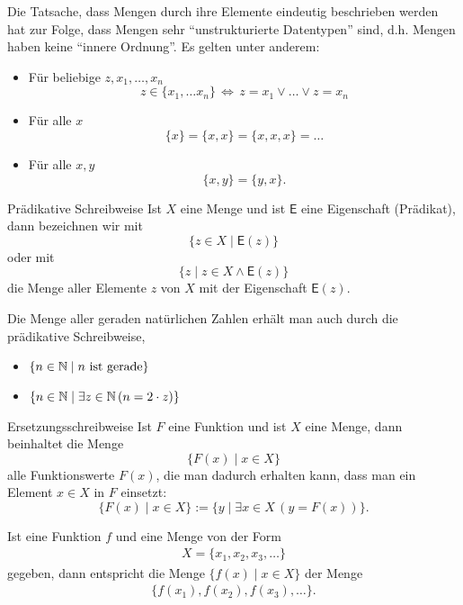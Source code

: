 \begin{remark}
    Die Tatsache, dass Mengen durch ihre Elemente eindeutig beschrieben werden hat zur Folge, dass Mengen sehr ``unstrukturierte Datentypen'' sind, d.h. Mengen haben keine ``innere Ordnung''. Es gelten unter anderem:
    \begin{itemize}
        \item Für beliebige $z,x_1,\dots,x_n$
            \[
                z\in\{x_1,\dots x_n\}\,\Leftrightarrow\, z=x_1\lor\dots\lor z=x_n
            \]
        \item Für alle $x$
            \[
                \{x\}=\{x,x\}=\{x,x,x\}=\dots
            \]
        \item Für alle $x,y$
            \[
                \{x,y\}=\{y,x\}.
            \]
    \end{itemize}
\end{remark}

\begin{concept}{Prädikative Schreibweise}
    Ist $X$ eine Menge und ist $\mathsf{E}$ eine Eigenschaft (Prädikat), dann bezeichnen wir mit
    \[
        \big\{z\in X\mid \mathsf{E}(z)\big\}
    \]
    oder mit
    \[
        \big\{z\mid z\in X\land\mathsf{E}(z)\big\}
    \]
    die Menge aller Elemente $z$ von $X$ mit der Eigenschaft $\mathsf{E}(z)$.
\end{concept}

\begin{example}
    Die Menge aller geraden natürlichen Zahlen erhält man auch durch die prädikative Schreibweise,
    \begin{itemize}
        \item $\{n\in\mathbb{N}\mid n\text{ ist gerade}\}$
        \item $\{n\in\mathbb{N}\mid \exists z\in\mathbb{N}\,(n=2\cdot z)\}$
    \end{itemize}
\end{example}

\begin{concept}{Ersetzungsschreibweise}
    Ist $F$ eine Funktion und ist $X$ eine Menge, dann beinhaltet die Menge
    \[
        \big\{F(x)\mid x\in X \big\}
    \]
    alle Funktionswerte $F(x)$, die man dadurch erhalten kann, dass man ein Element $x\in X$ in $F$ einsetzt:
    \[
        \big\{F(x)\mid x\in X\big\}:=\{y\mid \exists x\in X\,(y=F(x))\}.
    \]
\end{concept}

\begin{remark}
    Ist eine Funktion $f$ und eine Menge von der Form
    \begin{align*}
        X=\{x_1,x_2,x_3,\dots\}
    \end{align*}
    gegeben, dann entspricht die Menge $\{f(x)\mid x\in X\}$ der Menge
    \begin{align*}
        \{f(x_1),f(x_2),f(x_3),\dots\}.
    \end{align*}
\end{remark}

